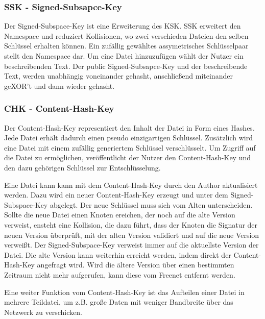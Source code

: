 \subsubsection{SSK - Signed-Subsapce-Key}
Der Signed-Subspace-Key ist eine Erweiterung des KSK. SSK erweitert den
Namespace und reduziert Kollisionen, wo zwei verschieden Dateien den
selben Schlüssel erhalten können.
Ein zufällig gewähltes assymetrisches Schlüsselpaar stellt den Namespace dar.
Um eine Datei hinzuzufügen wählt der Nutzer ein beschreibenden Text. Der
public Signed-Subsapce-Key und der beschreibende Text, werden unabhängig
voneinander gehasht, anschließend miteinander geXOR't und dann wieder gehasht.

\subsubsection{CHK - Content-Hash-Key}
Der Content-Hash-Key representiert den Inhalt der Datei in Form eines Hashes.
Jede Datei erhält dadurch einen pseudo einzigartigen Schlüssel. Zusätzlich wird
eine Datei mit einem zufällig generiertem Schlüssel verschlüsselt.
Um Zugriff auf die Datei zu ermöglichen, veröffentlicht der Nutzer den
Content-Hash-Key und den dazu gehörigen Schlüssel zur Entschlüsselung.

Eine Datei kann kann mit dem Content-Hash-Key durch den Author aktualisiert
werden. Dazu wird ein neuer Content-Hash-Key erzeugt und unter dem
Signed-Subspace-Key abgelegt. Der neue Schlüssel muss sich vom Alten
unterscheiden. Sollte die neue Datei einen Knoten ereichen, der noch auf die
alte Version verweist, ensteht eine Kollision, die dazu führt, dass der Knoten
die Signatur der neuen Version überprüft, mit der alten Version validiert und
auf die neue Version verweißt. Der Signed-Subspace-Key
verweist immer auf die aktuellste Version der Datei. Die alte Version kann
weiterhin erreicht werden, indem direkt der Content-Hash-Key angefragt wird.
Wird die ältere Version über einen bestimmten Zeitraum nicht mehr aufgerufen,
kann diese vom Freenet entfernt werden.

Eine weiter Funktion vom Content-Hash-Key ist das Aufteilen einer Datei
in mehrere Teildatei, um z.B. große Daten mit weniger Bandbreite über das
Netzwerk zu verschicken.
